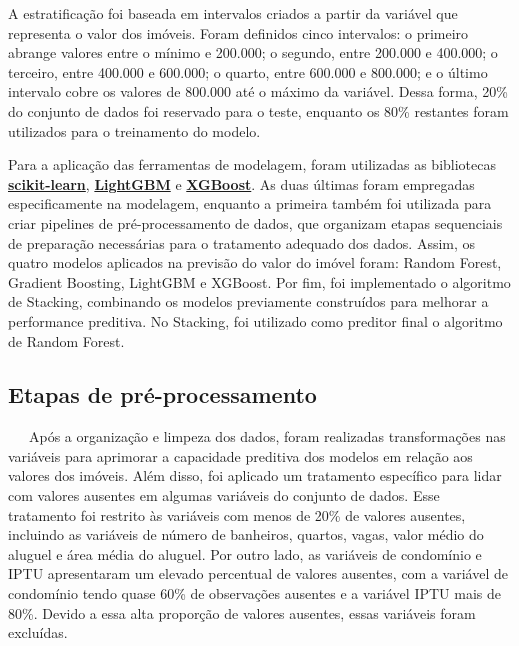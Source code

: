 \documentclass[
  12pt,
  a4paper,
]{scrreprt}
\begin{document}
A estratificação foi baseada em intervalos criados a partir da variável
que representa o valor dos imóveis. Foram definidos cinco intervalos: o
primeiro abrange valores entre o mínimo e 200.000; o segundo, entre
200.000 e 400.000; o terceiro, entre 400.000 e 600.000; o quarto, entre
600.000 e 800.000; e o último intervalo cobre os valores de 800.000 até
o máximo da variável. Dessa forma, 20\% do conjunto de dados foi
reservado para o teste, enquanto os 80\% restantes foram utilizados para
o treinamento do modelo.

\vspace{12pt}

Para a aplicação das ferramentas de modelagem, foram utilizadas as
bibliotecas
\href{https://scikit-learn.org/stable/}{\textbf{scikit-learn}},
\href{https://lightgbm.readthedocs.io/en/stable/}{\textbf{LightGBM}} e
\href{https://xgboost.readthedocs.io/en/stable/}{\textbf{XGBoost}}. As
duas últimas foram empregadas especificamente na modelagem, enquanto a
primeira também foi utilizada para criar pipelines de pré-processamento
de dados, que organizam etapas sequenciais de preparação necessárias
para o tratamento adequado dos dados. Assim, os quatro modelos aplicados
na previsão do valor do imóvel foram: Random Forest, Gradient Boosting,
LightGBM e XGBoost. Por fim, foi implementado o algoritmo de Stacking,
combinando os modelos previamente construídos para melhorar a
performance preditiva. No Stacking, foi utilizado como preditor final o
algoritmo de Random Forest.

\subsection{Etapas de
pré-processamento}\label{etapas-de-pruxe9-processamento}

~~~Após a organização e limpeza dos dados, foram realizadas
transformações nas variáveis para aprimorar a capacidade preditiva dos
modelos em relação aos valores dos imóveis. Além disso, foi aplicado um
tratamento específico para lidar com valores ausentes em algumas
variáveis do conjunto de dados. Esse tratamento foi restrito às
variáveis com menos de 20\% de valores ausentes, incluindo as variáveis
de número de banheiros, quartos, vagas, valor médio do aluguel e área
média do aluguel. Por outro lado, as variáveis de condomínio e IPTU
apresentaram um elevado percentual de valores ausentes, com a variável
de condomínio tendo quase 60\% de observações ausentes e a variável IPTU
mais de 80\%. Devido a essa alta proporção de valores ausentes, essas
variáveis foram excluídas.
\end{document}
